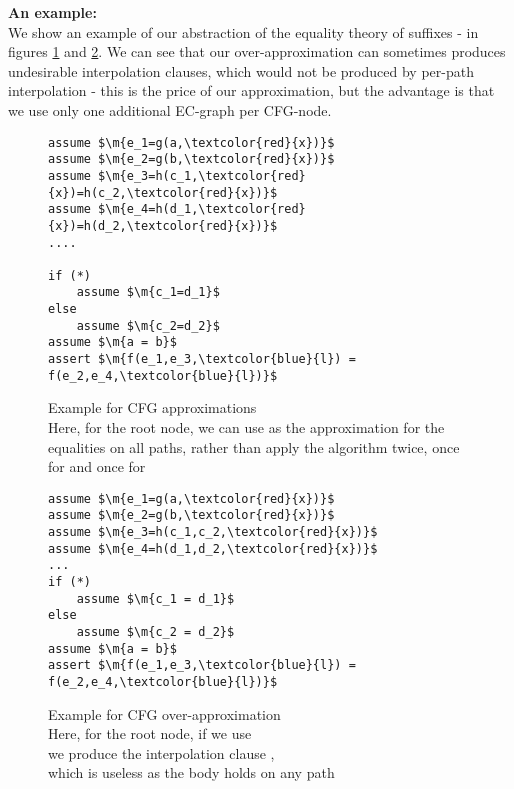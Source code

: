\textbf{An example:}\\
We show an example of our abstraction of the equality theory of suffixes - in figures \ref{example_4.2.1.8_program} and \ref{example_4.2.1.9_program}.
We can see that our over-approximation can sometimes produces undesirable interpolation clauses, which would not be produced by per-path interpolation - this is the price of our approximation, but the advantage is that we use only one additional EC-graph per CFG-node.

\begin{figure}
\begin{lstlisting}
assume $\m{e_1=g(a,\textcolor{red}{x})}$
assume $\m{e_2=g(b,\textcolor{red}{x})}$
assume $\m{e_3=h(c_1,\textcolor{red}{x})=h(c_2,\textcolor{red}{x})}$
assume $\m{e_4=h(d_1,\textcolor{red}{x})=h(d_2,\textcolor{red}{x})}$
....

if (*)
	assume $\m{c_1=d_1}$
else
	assume $\m{c_2=d_2}$
assume $\m{a = b}$
assert $\m{f(e_1,e_3,\textcolor{blue}{l}) = f(e_2,e_4,\textcolor{blue}{l})}$
\end{lstlisting}
\caption{Example for CFG approximations\\
Here, for the root node, we can use  as the approximation for the equalities on all paths,
rather than apply the algorithm twice, once for  and once for 
}
\label{example_4.2.1.8_program}
\end{figure}

\begin{figure}
\begin{lstlisting}
assume $\m{e_1=g(a,\textcolor{red}{x})}$
assume $\m{e_2=g(b,\textcolor{red}{x})}$
assume $\m{e_3=h(c_1,c_2,\textcolor{red}{x})}$
assume $\m{e_4=h(d_1,d_2,\textcolor{red}{x})}$
...
if (*)
	assume $\m{c_1 = d_1}$
else
	assume $\m{c_2 = d_2}$
assume $\m{a = b}$
assert $\m{f(e_1,e_3,\textcolor{blue}{l}) = f(e_2,e_4,\textcolor{blue}{l})}$
\end{lstlisting}
\caption{Example for CFG over-approximation\\
Here, for the root node, if we use  \\
we produce the interpolation clause ,\\
which is useless as the body holds on any path
}
\label{example_4.2.1.9_program}
\end{figure}


